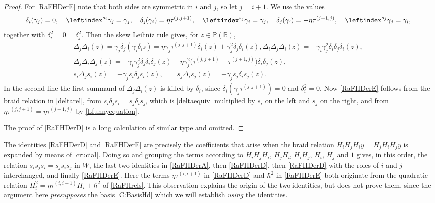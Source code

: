 \documentclass[a4paper,11pt]{amsart}
\numberwithin{equation}{subsection}
\theoremstyle{definition}
\theoremstyle{theorem}
\theoremstyle{remark}
\newcommand\Sym{W}
\newcommand\Po{\mathbb{P}(\mathbb{B})}
\begin{document}
\begin{proof}
  For \autoref{RaFHDerE}  note that both sides are symmetric in $i$ and $j$, so let $j=i+1$.
We use the values
\[
  \delta_i(\gamma_j)=0,\quad \leftindex^{s_i}\gamma_j=\gamma_j,\quad
  \delta_j(\gamma_i)=\eta\tau^{(j,j+1)},\quad \leftindex^{s_j}\gamma_i=\gamma_j,\quad
  \delta_j(\gamma_j)=-\eta\tau^{(j+1,j)},\quad \leftindex^{s_j}\gamma_j=\gamma_i,
\]
together with $\delta_i^2=0=\delta_j^2$. Then the skew Leibniz rule gives, for $z\in\Po$,
\begin{equation*}
\begin{gathered}
  \Delta_j\Delta_i(z)=\gamma_j\delta_j(\gamma_i\delta_iz)
     =\eta\gamma_j\tau^{(j,j+1)}\delta_i(z)+\gamma_j^2\delta_j\delta_i(z),
  \Delta_i\Delta_j\Delta_i(z)=-\gamma_i\gamma_j^2\delta_i\delta_j\delta_i(z),\\
  \Delta_j\Delta_i\Delta_j(z)=-\gamma_i\gamma_j^2\delta_j\delta_i\delta_j(z)
     -\eta\gamma_j^2\bigl(\tau^{(j,j+1)}-\tau^{(j+1,j)}\bigr)\delta_i\delta_j(z),\\
  s_i\Delta_js_i(z)=-\gamma_js_i\delta_js_i(z),\qquad
  s_j\Delta_is_j(z)=-\gamma_js_j\delta_is_j(z).
  \end{gathered}
\end{equation*}
In the second line the first summand of $\Delta_j\Delta_i(z)$ is killed by $\delta_i$, since
$\delta_i(\gamma_j\tau^{(j,j+1)})=0$ and $\delta_i^2=0$. Now \autoref{RaFHDerE} follows from the
braid relation in \autoref{deltarel}, from $s_i\delta_js_i=s_j\delta_is_j$, which is
\autoref{deltaequiv} multiplied by $s_i$ on the left and $s_j$ on the right, and from
$\eta\tau^{(j,j+1)}=\eta\tau^{(j+1,j)}$ by \autoref{Lfunnyequation}.

The proof of  \autoref{RaFHDerD} is a long calculation of similar type and omitted.
\end{proof}

\begin{Remark}\label{R:whereDE}
  The identities \autoref{RaFHDerD} and \autoref{RaFHDerE} are precisely the
  coefficients that arise when the braid relation
  $H_iH_jH_iy=H_jH_iH_jy$ is expanded by means of \autoref{crucial}. Doing
  so and grouping the terms according to $H_iH_jH_i$, $H_jH_i$,
  $H_iH_j$, $H_i$, $H_j$ and $1$ gives, in this order, the relation
  $s_is_js_i=s_js_is_j$ in $\Sym$, the last two identities in
  \autoref{RaFHDerA}, then \autoref{RaFHDerD}, then \autoref{RaFHDerD} with
  the roles of $i$ and $j$ interchanged, and finally \autoref{RaFHDerE}.
  Here the terms $\eta\tau^{(i,i+1)}$ in \autoref{RaFHDerD} and $\hbar^2$
  in \autoref{RaFHDerE} both originate from the quadratic relation
  $H_i^2=\eta\tau^{(i,i+1)}H_i+\hbar^2$ of \autoref{RaFHrels}. This observation explains the origin of the two identities, but does not prove
  them, since the argument here \emph{presupposes} the basis \autoref{C:BasisHd} which we will establish \emph{using} the identities.
\end{Remark}
\end{document}
